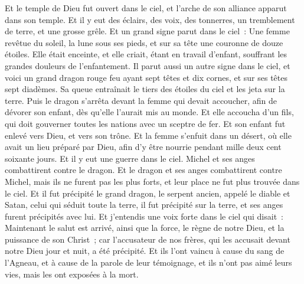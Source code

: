 \begin{multicols}{2}
Et le temple de Dieu fut ouvert dans le ciel, et l'arche de son alliance apparut dans son temple. Et il y eut des éclairs, des voix, des tonnerres, un tremblement de terre, et une grosse grêle.
\VerseOne{}Et un grand signe parut dans le ciel~: Une femme revêtue du soleil, la lune sous ses pieds, et sur sa tête une couronne de douze étoiles.
Elle était enceinte, et elle criait, étant en travail d'enfant, souffrant les grandes douleurs de l'enfantement.
Il parut aussi un autre signe dans le ciel, et voici un grand dragon rouge feu ayant sept têtes et dix cornes, et sur ses têtes sept diadèmes.
Sa queue entraînait le tiers des étoiles du ciel et les jeta sur la terre. Puis le dragon s'arrêta devant la femme qui devait accoucher, afin de dévorer son enfant, dès qu'elle l'aurait mis au monde.
Et elle accoucha d'un fils, qui doit gouverner toutes les nations avec un sceptre de fer. Et son enfant fut enlevé vers Dieu, et vers son trône.
Et la femme s'enfuit dans un désert, où elle avait un lieu préparé par Dieu, afin d'y être nourrie pendant mille deux cent soixante jours.
Et il y eut une guerre dans le ciel. Michel et ses anges combattirent contre le dragon. Et le dragon et ses anges combattirent contre Michel,
mais ils ne furent pas les plus forts, et leur place ne fut plus trouvée dans le ciel.
Et il fut précipité le grand dragon, le serpent ancien, appelé le diable et Satan, celui qui séduit toute la terre, il fut précipité sur la terre, et ses anges furent précipités avec lui.
Et j'entendis une voix forte dans le ciel qui disait~: Maintenant le salut est arrivé, ainsi que la force, le règne de notre Dieu, et la puissance de son Christ~; car l'accusateur de nos frères, qui les accusait devant notre Dieu jour et nuit, a été précipité.
Et ils l'ont vaincu à cause du sang de l'Agneau, et à cause de la parole de leur témoignage, et ils n'ont pas aimé leurs vies, mais les ont exposées à la mort.

\end{multicols}

